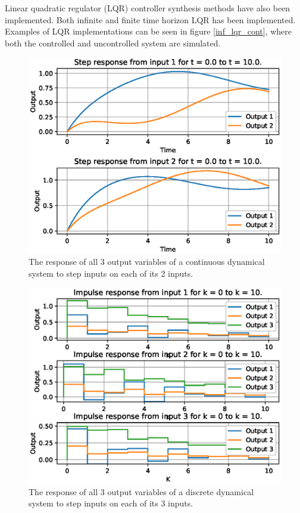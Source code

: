 \documentclass[11pt,a4paper]{article}
\begin{document}
Linear quadratic regulator (LQR) controller synthesis methods have also been implemented. Both infinite and finite time horizon LQR has been implemented. Examples of LQR implementations can be seen in figure \ref{inf_lqr_cont}, where both the controlled and uncontrolled system are simulated.


\begin{figure}[H]
	\centering	
		\includegraphics[scale=0.8]{cont_step}
	\caption{The response of all 3 output variables of a continuous dynamical system to step inputs on each of its 2 inputs.}
	\label{cont_step}
\end{figure}



\begin{figure}[H]
	\centering
		\includegraphics[scale=0.8]{disc_impulse}
	\caption{The response of all 3 output variables of a discrete dynamical system to step inputs on each of its 3 inputs.}
	\label{disc_impulse}
\end{figure}
\end{document}
